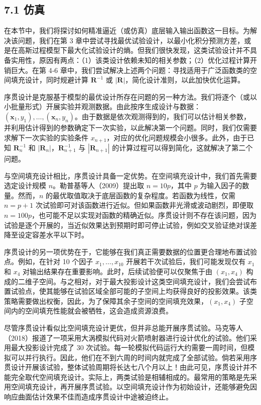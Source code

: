 \documentclass{ctexart}
\begin{document}
\subsection*{7.1 仿真}

在本节中，我们将探讨如何精准逼近（或仿真）底层输入输出函数这一目标。为解决该问题，我们在第 3 章中尝试寻找最优试验设计，以最小化积分预测方差，或是在高斯过程模型下最大化试验设计的熵。但我们很快发现，这类试验设计并不具备实用性，原因有两点：（1）该类设计依赖未知的相关参数；（2）优化过程计算开销巨大。在第 4‑6 章中，我们尝试解决上述两个问题：寻找适用于广泛函数类的空间填充设计，同时规避计算 $\boldsymbol{R}^{-1}$ 或 $|\boldsymbol{R}|$，简化设计准则，以此加快优化运算。

序贯设计是克服基于模型的最优设计所存在问题的另一种方法。我们将逐个（或以小批量形式）开展实验并观测数据。由此按序生成设计与数据：$(\boldsymbol{x}_1,y_1),\dots,(\boldsymbol{x}_n,y_n)$。由于数据是依次观测得到的，我们可以估计相关参数，并利用估计得到的参数确定下一次实验，以此解决第一个问题。同时，我们仅需要求解下一次实验的实验条件 $x_{n+1}$，对应的优化问题规模会小很多。此外，由于已知 $\boldsymbol{R}^{-1}_{n}$ 和 $|\boldsymbol{R}_n|$，$\boldsymbol{R}^{-1}_{n+1}$ 与 $|\boldsymbol{R}_{n+1}|$ 的计算过程可以得到简化，这就解决了第二个问题。

与空间填充设计相比，序贯设计具备一定优势。在空间填充设计中，我们首先需要选定设计规模 $n$。勒普基等人（2009）提出取 $n=10p$，其中 $p$ 为输入因子的数量。然而，$n$ 的最优取值取决于底层函数的复杂程度。若函数为线性，仅需 $n=p+1$ 次试验即可对该函数进行近似。但如果函数非光滑或波动剧烈，即便取 $n=100p$，也可能不足以实现对函数的精确近似。序贯设计则不存在该问题，因为试验是逐个开展的，当近似效果达到预期时即可停止试验，例如交叉验证绝对误差降至设定容差水平以下时。

序贯设计的另一项优势在于，它能够在我们真正需要数据的位置更合理地布置试验点。例如，在针对 10 个因子 $x_1,\dots,x_{10}$ 开展若干次试验后，我们可能发现仅有 $x_1$ 和 $x_4$ 对输出结果存在重要影响。此时，后续试验便可以仅聚焦于由 $(x_1,x_4)$ 构成的二维子空间。与之相对，对于最大投影设计这类空间填充设计，我们会尝试布置试验点，使其能够在试验区域全部可能的子空间上均获得良好的投影效果。该类策略需要做出权衡，因此，为了保障其余子空间的空间填充效果，$(x_1,x_4)$ 子空间内的空间填充性能就会被牺牲，这会造成资源浪费。

尽管序贯设计看似比空间填充设计更优，但并非总能开展序贯试验。马克等人（2018）报道了一项采用大涡模拟代码对火箭喷射器进行设计优化的试验。他们采用最大投影设计完成了 30 次试验。每一轮模拟代码运行大约需要一周时间，但模拟可以并行执行。因此，他们在不到六周的时间内就完成了全部试验。倘若采用序贯设计开展该试验，整体试验周期将长达七八个月以上！由此可见，序贯设计并不能完全取代空间填充设计。实际上，两类试验是相辅相成的。最常用的策略是先采用空间填充设计，再开展序贯试验。以空间填充设计作为初始设计，还能够避免因响应曲面估计效果不佳而造成序贯设计中途被迫终止。
\end{document}
